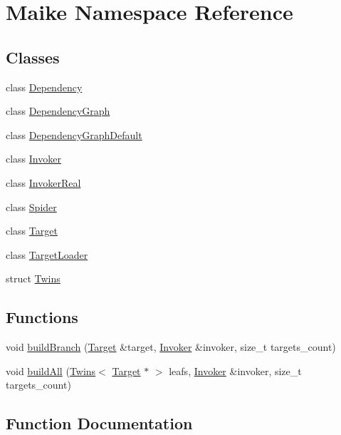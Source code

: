 \hypertarget{namespace_maike}{}\section{Maike Namespace Reference}
\label{namespace_maike}
\subsection*{Classes}
\begin{DoxyCompactItemize}
\item 
class \hyperlink{class_maike_1_1_dependency}{Dependency}
\item 
class \hyperlink{class_maike_1_1_dependency_graph}{Dependency\+Graph}
\item 
class \hyperlink{class_maike_1_1_dependency_graph_default}{Dependency\+Graph\+Default}
\item 
class \hyperlink{class_maike_1_1_invoker}{Invoker}
\item 
class \hyperlink{class_maike_1_1_invoker_real}{Invoker\+Real}
\item 
class \hyperlink{class_maike_1_1_spider}{Spider}
\item 
class \hyperlink{class_maike_1_1_target}{Target}
\item 
class \hyperlink{class_maike_1_1_target_loader}{Target\+Loader}
\item 
struct \hyperlink{struct_maike_1_1_twins}{Twins}
\end{DoxyCompactItemize}
\subsection*{Functions}
\begin{DoxyCompactItemize}
\item 
void \hyperlink{namespace_maike_a1b65c50ccc0ce45272d1eb6557057ec0}{build\+Branch} (\hyperlink{class_maike_1_1_target}{Target} \&target, \hyperlink{class_maike_1_1_invoker}{Invoker} \&invoker, size\+\_\+t targets\+\_\+count)
\item 
void \hyperlink{namespace_maike_aed76b0165d074646da9cfa1ad7bfc5b7}{build\+All} (\hyperlink{struct_maike_1_1_twins}{Twins}$<$ \hyperlink{class_maike_1_1_target}{Target} $\ast$ $>$ leafs, \hyperlink{class_maike_1_1_invoker}{Invoker} \&invoker, size\+\_\+t targets\+\_\+count)
\end{DoxyCompactItemize}


\subsection{Function Documentation}
